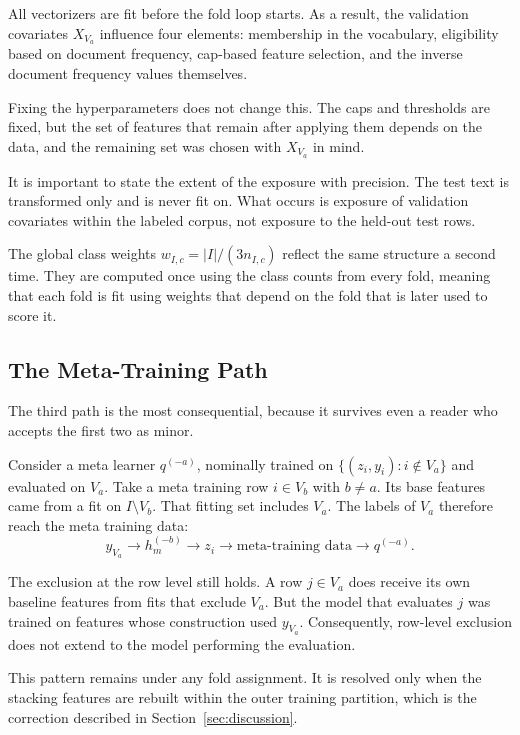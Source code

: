 \documentclass[runningheads]{llncs}
\begin{document}
All vectorizers are fit before the fold loop starts. As a result, the validation covariates $X_{V_a}$ influence four elements: membership in the vocabulary, eligibility based on document frequency, cap-based feature selection, and the inverse document frequency values themselves.

Fixing the hyperparameters does not change this. The caps and thresholds are fixed, but the set of features that remain after applying them depends on the data, and the remaining set was chosen with $X_{V_a}$ in mind.

It is important to state the extent of the exposure with precision. The test text is transformed only and is never fit on. What occurs is exposure of validation covariates within the labeled corpus, not exposure to the held-out test rows.

The global class weights $w_{I,c} = |I| / (3n_{I,c})$ reflect the same structure a second time. They are computed once using the class counts from every fold, meaning that each fold is fit using weights that depend on the fold that is later used to score it.

\subsection{The Meta-Training Path}

The third path is the most consequential, because it survives even a reader who accepts the first two as minor.

Consider a meta learner $q^{(-a)}$, nominally trained on $\{(z_i, y_i) : i \notin V_a\}$ and evaluated on $V_a$. Take a meta training row $i \in V_b$ with $b \neq a$. Its base features came from a fit on $I \setminus V_b$. That fitting set includes $V_a$. The labels of $V_a$ therefore reach the meta training data:
\begin{equation}
y_{V_a} \longrightarrow h_m^{(-b)} \longrightarrow z_i \longrightarrow \text{meta-training data} \longrightarrow q^{(-a)}.
\label{eq:path}
\end{equation}

The exclusion at the row level still holds. A row $j \in V_a$ does receive its own baseline features from fits that exclude $V_a$. But the model that evaluates $j$ was trained on features whose construction used $y_{V_a}$. Consequently, row-level exclusion does not extend to the model performing the evaluation.

This pattern remains under any fold assignment. It is resolved only when the stacking features are rebuilt within the outer training partition, which is the correction described in Section~\ref{sec:discussion}.
\end{document}
